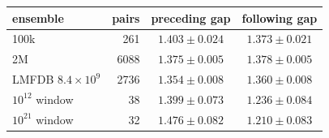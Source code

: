 \begin{tabular}{@{}lrcc@{}}
\toprule
ensemble & pairs & preceding gap & following gap\\
\midrule
100k & 261 & $1.403\pm0.024$ & $1.373\pm0.021$\\
2M & 6088 & $1.375\pm0.005$ & $1.378\pm0.005$\\
LMFDB $8.4\times10^{9}$ & 2736 & $1.354\pm0.008$ & $1.360\pm0.008$\\
$10^{12}$ window & 38 & $1.399\pm0.073$ & $1.236\pm0.084$\\
$10^{21}$ window & 32 & $1.476\pm0.082$ & $1.210\pm0.083$\\
\bottomrule
\end{tabular}
